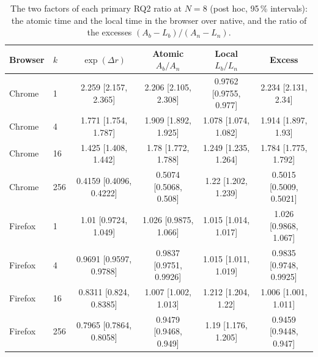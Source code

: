 \begin{table}[htbp]
\caption{The two factors of each primary RQ2 ratio at $N=8$ (post hoc, 95\,\% intervals): the atomic time and the local time in the browser over native, and the ratio of the excesses $(A_b-L_b)/(A_n-L_n)$.}\label{tab:decomposition}
\centering\footnotesize
\begin{tabular}{llcccc}
\toprule
Browser & $k$ & $\exp(\Delta r)$ & Atomic $A_b/A_n$ & Local $L_b/L_n$ & Excess \\
\midrule
Chrome & 1 & 2.259 [2.157, 2.365] & 2.206 [2.105, 2.308] & 0.9762 [0.9755, 0.977] & 2.234 [2.131, 2.34] \\
Chrome & 4 & 1.771 [1.754, 1.787] & 1.909 [1.892, 1.925] & 1.078 [1.074, 1.082] & 1.914 [1.897, 1.93] \\
Chrome & 16 & 1.425 [1.408, 1.442] & 1.78 [1.772, 1.788] & 1.249 [1.235, 1.264] & 1.784 [1.775, 1.792] \\
Chrome & 256 & 0.4159 [0.4096, 0.4222] & 0.5074 [0.5068, 0.508] & 1.22 [1.202, 1.239] & 0.5015 [0.5009, 0.5021] \\
Firefox & 1 & 1.01 [0.9724, 1.049] & 1.026 [0.9875, 1.066] & 1.015 [1.014, 1.017] & 1.026 [0.9868, 1.067] \\
Firefox & 4 & 0.9691 [0.9597, 0.9788] & 0.9837 [0.9751, 0.9926] & 1.015 [1.011, 1.019] & 0.9835 [0.9748, 0.9925] \\
Firefox & 16 & 0.8311 [0.824, 0.8385] & 1.007 [1.002, 1.013] & 1.212 [1.204, 1.22] & 1.006 [1.001, 1.011] \\
Firefox & 256 & 0.7965 [0.7864, 0.8058] & 0.9479 [0.9468, 0.949] & 1.19 [1.176, 1.205] & 0.9459 [0.9448, 0.947] \\
\bottomrule
\end{tabular}
\end{table}
